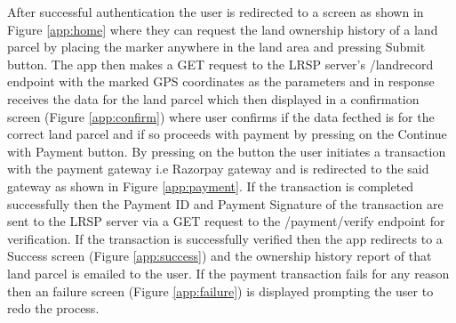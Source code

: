 \documentclass{article}
\begin{document}
        After successful authentication the user is redirected to a screen as shown in Figure \ref{app:home} where they can request the land ownership history of a land parcel by placing the marker anywhere in the land area and pressing Submit button. The app then makes a GET request to the LRSP server's /landrecord endpoint with the marked GPS coordinates as the parameters and in response receives the data for the land parcel which then displayed in a confirmation screen (Figure \ref{app:confirm}) where user confirms if the data fecthed is for the correct land parcel and if so proceeds with payment by pressing on the Continue with Payment button. By pressing on the button the user initiates a transaction with the payment gateway i.e Razorpay gateway and is redirected to the said gateway as shown in Figure \ref{app:payment}. If the transaction is completed successfully then the Payment ID and Payment Signature of the transaction are sent to the LRSP server via a GET request to the /payment/verify endpoint for verification. If the transaction is successfully verified then the app redirects to a Success screen (Figure \ref{app:success}) and the ownership history report of that land parcel is emailed to the user. If the payment transaction fails for any reason then an failure screen (Figure \ref{app:failure}) is displayed prompting the user to redo the process.
        
\end{document}

